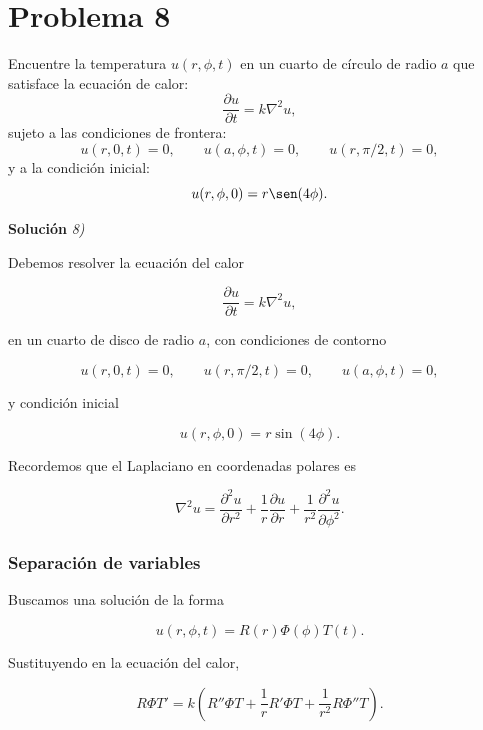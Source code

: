 \documentclass[12pt]{article}
\begin{document}
\section*{Problema 8}
Encuentre la temperatura \(u(r, \phi, t)\) en un cuarto de círculo de radio \(a\) que satisface la ecuación de calor:
\[
\frac{\partial u}{\partial t} = k \nabla^2 u,
\]
sujeto a las condiciones de frontera:
\[
u(r, 0, t) = 0, \qquad u(a, \phi, t) = 0, \qquad u(r, \pi/2, t) = 0,
\]
y a la condición inicial:
\[
u(r, \phi, 0) = r \sen(4\phi).
\]

\vspace{0.5cm}
{\bf Soluci\'on }{\em 8)}
\vspace{0.5cm}

Debemos resolver la ecuación del calor

\begin{equation}
\frac{\partial u}{\partial t}=k\nabla^2u,
\end{equation}

en un cuarto de disco de radio $a$, con condiciones de contorno

\begin{equation}
u(r,0,t)=0,\qquad
u(r,\pi/2,t)=0,\qquad
u(a,\phi,t)=0,
\end{equation}

y condición inicial

\begin{equation}
u(r,\phi,0)=r\sin(4\phi).
\end{equation}

Recordemos que el Laplaciano en coordenadas polares es

\begin{equation}
\nabla^2u=
\frac{\partial^2u}{\partial r^2}
+\frac1r\frac{\partial u}{\partial r}
+\frac1{r^2}\frac{\partial^2u}{\partial\phi^2}.
\end{equation}

\subsubsection*{Separación de variables}

Buscamos una solución de la forma

\begin{equation}
u(r,\phi,t)=R(r)\Phi(\phi)T(t).
\end{equation}

Sustituyendo en la ecuación del calor,

\[
R\Phi T'
=
k
\left(
R''\Phi T
+\frac1rR'\Phi T
+\frac1{r^2}R\Phi''T
\right).
\]
\end{document}
